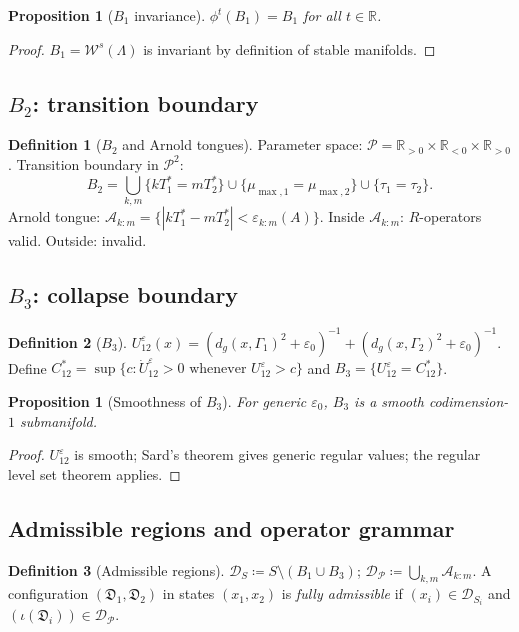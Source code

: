 \documentclass[12pt, oneside]{book}
\theoremstyle{plain}
\newtheorem{proposition}[theorem]{Proposition}
\theoremstyle{definition}
\newtheorem{definition}{Definition}[section]
\theoremstyle{remark}
\newcommand{\R}{\mathbb{R}}
\newcommand{\dm}{\mathfrak{D}}
\newcommand{\Orb}{\Gamma}
\newcommand{\cP}{\mathcal{P}}
\newcommand{\cD}{\mathcal{D}}
\newcommand{\eps}{\varepsilon}
\newcommand{\dg}{d_g}
\newcommand{\abs}[1]{\left|#1\right|}
\begin{document}
\begin{proposition}[$B_1$ invariance]\label{prop:B1}
$\phi^t(B_1)=B_1$ for all $t\in\R$.
\end{proposition}
\begin{proof}
$B_1=\mathcal{W}^s(\Lambda)$ is invariant by definition of stable manifolds.
\end{proof}

\subsection{\texorpdfstring{$B_2$}{B2}: transition boundary}

\begin{definition}[$B_2$ and Arnold tongues]\label{def:B2}
Parameter space: $\cP=\R_{>0}\times\R_{<0}\times\R_{>0}$.
Transition boundary in $\cP^2$:
\[
  B_2=\bigcup_{k,m}\{kT_1^*=mT_2^*\}
  \cup\{\mu_{\max,1}=\mu_{\max,2}\}\cup\{\tau_1=\tau_2\}.
\]
Arnold tongue:
$\mathcal{A}_{k:m}=\{\abs{kT_1^*-mT_2^*}<\eps_{k:m}(A)\}$.
Inside $\mathcal{A}_{k:m}$: $R$-operators valid. Outside: invalid.
\end{definition}

\subsection{\texorpdfstring{$B_3$}{B3}: collapse boundary}

\begin{definition}[$B_3$]\label{def:B3}
$U_{12}^\eps(x)=(\dg(x,\Orb_1)^2+\eps_0)^{-1}
+(\dg(x,\Orb_2)^2+\eps_0)^{-1}$. Define
$C_{12}^*=\sup\{c:\dot U_{12}^\eps>0\text{ whenever }U_{12}^\eps>c\}$
and $B_3=\{U_{12}^\eps=C_{12}^*\}$.
\end{definition}

\begin{proposition}[Smoothness of $B_3$]\label{prop:B3}
For generic $\eps_0$, $B_3$ is a smooth codimension-$1$ submanifold.
\end{proposition}
\begin{proof}
$U_{12}^\eps$ is smooth; Sard's theorem gives generic regular values;
the regular level set theorem applies.
\end{proof}

\subsection{Admissible regions and operator grammar}

\begin{definition}[Admissible regions]\label{def:admissible}
$\cD_S\coloneqq S\setminus(B_1\cup B_3)$;\quad
$\cD_\cP\coloneqq\bigcup_{k,m}\mathcal{A}_{k:m}$.
A configuration $(\dm_1,\dm_2)$ in states $(x_1,x_2)$ is
\emph{fully admissible} if
$(x_i)\in\cD_{S_i}$ and $(\iota(\dm_i))\in\cD_\cP$.
\end{definition}
\end{document}
